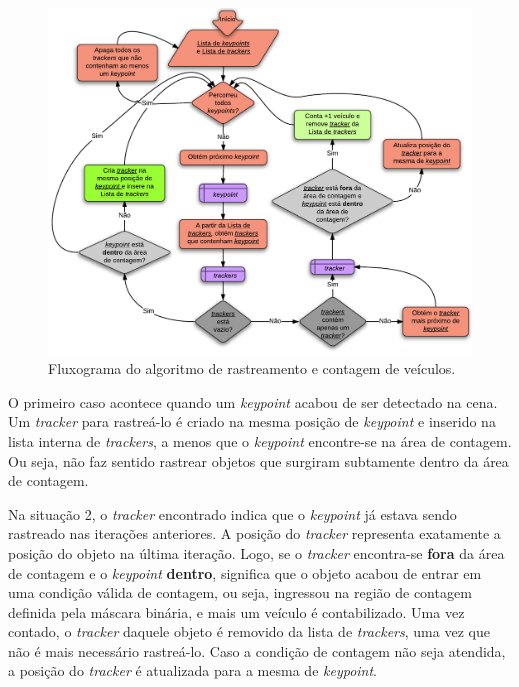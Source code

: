 \begin{figure}[ht]
  \begin{center}
    \includegraphics[scale=0.85]{imgs/fluxograma_contagem.pdf}
  \end{center}
  \caption{Fluxograma do algoritmo de rastreamento e contagem de veículos.}
  \label{fig:fluxograma_contagem}
\end{figure}

O primeiro caso acontece quando um \textit{keypoint} acabou de ser detectado na cena. Um \textit{tracker} para rastreá-lo é criado na mesma posição de \textit{keypoint} e inserido na lista interna de \textit{trackers}, a menos que o \textit{keypoint} encontre-se na área de contagem. Ou seja, não faz sentido rastrear objetos que surgiram subtamente dentro da área de contagem.

Na situação 2, o \textit{tracker} encontrado indica que o \textit{keypoint} já estava sendo rastreado nas iterações anteriores. A posição do \textit{tracker} representa exatamente a posição do objeto na última iteração. Logo, se o \textit{tracker} encontra-se \textbf{fora} da área de contagem e o \textit{keypoint} \textbf{dentro}, significa que o objeto acabou de entrar em uma condição válida de contagem, ou seja, ingressou na região de contagem definida pela máscara binária, e mais um veículo é contabilizado. Uma vez contado, o \textit{tracker} daquele objeto é removido da lista de \textit{trackers}, uma vez que não é mais necessário rastreá-lo. Caso a condição de contagem não seja atendida, a posição do \textit{tracker} é atualizada para a mesma de \textit{keypoint}.

